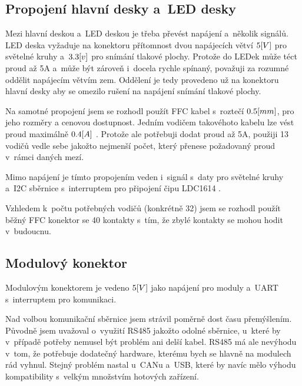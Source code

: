 \subsection{Propojení hlavní desky a~LED desky}
Mezi hlavní deskou a~LED deskou je třeba převést napájení a~několik signálů.
LED deska vyžaduje na konektoru přítomnost dvou napájecích větví \(5\-[V]\) pro světelné kruhy a~\(3.3\-[v]\) pro snímání tlakové plochy.
Protože do LEDek může téct proud až 5A a~může být zároveň i~docela rychle spínaný, považuji za rozumné oddělit napájecím větvím zem.
Oddělení je tedy provedeno už na konektoru hlavní desky aby se omezilo rušení na napájení snímání tlakové plochy.

Na samotné propojení jsem se rozhodl použít FFC kabel s~roztečí \(0.5\-[mm]\), pro jeho rozměry a cenovou dostupnost.
Jedním vodičem takovéhoto kabelu lze vést proud maximálně \(0.4\-[A]\) \cite{FFC-konektor}.
Protože ale potřebuji dodat proud až 5A, použiji 13 vodičů vedle sebe jakožto nejmenší počet, který přenese požadovaný proud v~rámci daných mezí.

Mimo napájení je tímto propojením veden i~signál s~daty pro světelné kruhy a~I2C sběrnice s~interruptem pro připojení čipu LDC1614 \cite{LDC1614}.

Vzhledem k~počtu potřebných vodičů (konkrétně 32) jsem se rozhodl použít běžný FFC konektor se 40 kontakty s~tím, že zbylé kontakty se mohou hodit v~budoucnu.

\subsection{Modulový konektor \label{sec:ModulovyKonektor}}
Modulovým konektorem je vedeno \(5\-[V]\) jako napájení pro moduly a~UART s~interruptem pro komunikaci.

Nad volbou komunikační sběrnice jsem strávil poměrně dost času přemýšlením.
Původně jsem uvažoval o~využití RS485 jakožto odolné sběrnice, u~které by v~případě potřeby nemusel být problém ani delší kabel.
RS485 má ale nevýhodu v~tom, že potřebuje dodatečný hardware, kterému bych se hlavně na modulech rád vyhnul.
Stejný problém nastal u~CANu a~USB, které by navíc mělo výhodu kompatibility s~velkým množstvím hotových zařízení.

